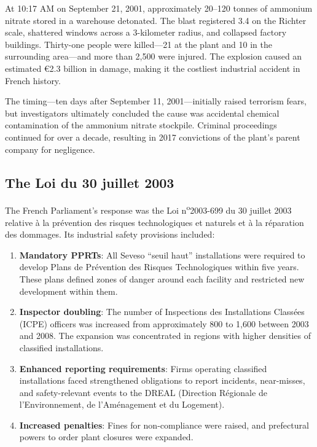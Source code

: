 \documentclass[12pt]{article}
\begin{document}
At 10:17 AM on September 21, 2001, approximately 20--120 tonnes of ammonium nitrate stored in a warehouse detonated. The blast registered 3.4 on the Richter scale, shattered windows across a 3-kilometer radius, and collapsed factory buildings. Thirty-one people were killed---21 at the plant and 10 in the surrounding area---and more than 2,500 were injured. The explosion caused an estimated \euro{}2.3 billion in damage, making it the costliest industrial accident in French history.

The timing---ten days after September 11, 2001---initially raised terrorism fears, but investigators ultimately concluded the cause was accidental chemical contamination of the ammonium nitrate stockpile. Criminal proceedings continued for over a decade, resulting in 2017 convictions of the plant's parent company for negligence.

\subsection{The Loi du 30 juillet 2003}

The French Parliament's response was the Loi n\textsuperscript{o}2003-699 du 30 juillet 2003 relative \`a la pr\'evention des risques technologiques et naturels et \`a la r\'eparation des dommages. Its industrial safety provisions included:

\begin{enumerate}
\item \textbf{Mandatory PPRTs}: All Seveso ``seuil haut'' installations were required to develop Plans de Pr\'evention des Risques Technologiques within five years. These plans defined zones of danger around each facility and restricted new development within them.

\item \textbf{Inspector doubling}: The number of Inspections des Installations Class\'ees (ICPE) officers was increased from approximately 800 to 1,600 between 2003 and 2008. The expansion was concentrated in regions with higher densities of classified installations.

\item \textbf{Enhanced reporting requirements}: Firms operating classified installations faced strengthened obligations to report incidents, near-misses, and safety-relevant events to the DREAL (Direction R\'egionale de l'Environnement, de l'Am\'enagement et du Logement).

\item \textbf{Increased penalties}: Fines for non-compliance were raised, and prefectural powers to order plant closures were expanded.
\end{enumerate}
\end{document}
